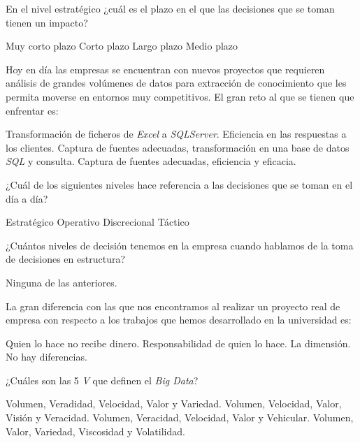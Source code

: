 \documentclass[a4paper]{exam}
\begin{document}
\begin{questions}
  \question En el nivel estratégico ¿cuál es el plazo en el que las
  decisiones que se toman tienen un impacto?

  \begin{choices}
    \choice Muy corto plazo
    \choice Corto plazo
    \CorrectChoice  Largo plazo
    \choice Medio plazo
  \end{choices}

  \question Hoy en día las empresas se encuentran con nuevos proyectos
  que requieren análisis de grandes volúmenes de datos para extracción
  de conocimiento que les permita moverse en entornos muy
  competitivos. El gran reto al que se tienen que enfrentar es:

  \begin{choices}
    \choice Transformación de ficheros de \emph{Excel} a
    \emph{SQLServer}.
    \choice Eficiencia en las respuestas a los clientes.
    \choice Captura de fuentes adecuadas, transformación en una base
    de datos \emph{SQL} y consulta.
    \CorrectChoice Captura de fuentes adecuadas, eficiencia y eficacia.
  \end{choices}

  \question ¿Cuál de los siguientes niveles hace referencia a las
  decisiones que se toman en el día a día?

  \begin{choices}
    \choice Estratégico
    \CorrectChoice Operativo
    \choice Discrecional
    \choice Táctico
  \end{choices}

  \question ¿Cuántos niveles de decisión tenemos en la empresa cuando
  hablamos de la toma de decisiones en estructura?

  \begin{choices}
    \choice Ninguna de las anteriores.
  \end{choices}

  \question La gran diferencia con las que nos encontramos al realizar
  un proyecto real de empresa con respecto a los trabajos que hemos
  desarrollado en la universidad es:

  \begin{choices}
    \choice Quien lo hace no recibe dinero.
    \choice Responsabilidad de quien lo hace.
    \CorrectChoice La dimensión.
    \choice No hay diferencias.
  \end{choices}

  \question ¿Cuáles son las 5 \emph{V} que definen el \emph{Big Data}?

  \begin{choices}
    \CorrectChoice Volumen, Veradidad, Velocidad, Valor y Variedad.
    \choice Volumen, Velocidad, Valor, Visión y Veracidad.
    \choice Volumen, Veracidad, Velocidad, Valor y Vehicular.
    \choice Volumen, Valor, Variedad, Viscosidad y Volatilidad.
  \end{choices}
  
\end{questions}
\end{document}
